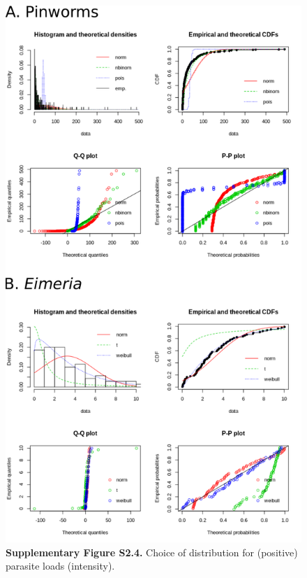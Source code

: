 \begin{figure}[H]
	\centering
	\includegraphics[width=\linewidth,height=\textheight,keepaspectratio]{images/2article1/SupplementaryFigureS4.pdf}
	\captionsetup{labelformat=empty}
	\caption{\textbf{Supplementary Figure S2.4.} Choice of distribution for (positive) parasite loads (intensity).}
\end{figure}

\newpage


